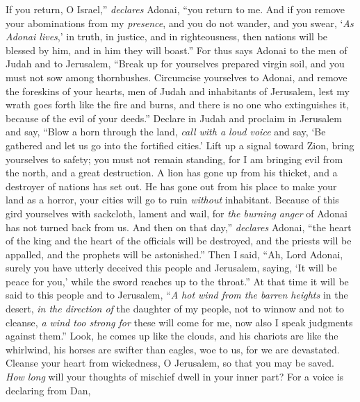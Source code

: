\begin{biblechapter} %
\verse If you return, O Israel,” \textit{declares} Adonai, 
“you return to me. 
And if you remove your abominations from my \textit{presence}, 
and you do not wander,
\verse and you swear, ‘\textit{As Adonai lives},’ 
in truth, in justice, and in righteousness, 
then nations will be blessed by him, 
and in him they will boast.”
\verse For thus says Adonai 
to the men of Judah and to Jerusalem, 
“Break up for yourselves prepared virgin soil, 
and you must not sow among thornbushes.
\verse Circumcise yourselves to Adonai, 
and remove the foreskins of your hearts, 
men of Judah and inhabitants of Jerusalem, 
lest my wrath goes forth like the fire and burns, 
and there is no one who extinguishes it, 
because of the evil of your deeds.”
 Declare in Judah and proclaim in Jerusalem and say, 
“Blow a horn through the land, 
\textit{call with a loud voice} and say, 
‘Be gathered and let us go into the fortified cities.’
\verse Lift up a signal toward Zion, 
bring yourselves to safety; you must not remain standing, 
for I am bringing evil from the north, 
and a great destruction.
\verse A lion has gone up from his thicket, 
and a destroyer of nations has set out. 
He has gone out from his place to make your land as a horror, 
your cities will go to ruin \textit{without} inhabitant.
\verse Because of this gird yourselves with sackcloth, lament and wail, 
for \textit{the burning anger} of Adonai has not turned back from us.
\verse And then on that day,” \textit{declares} Adonai, 
“the heart of the king and the heart of the officials will be destroyed, 
and the priests will be appalled, 
and the prophets will be astonished.”
\verse Then I said, “Ah, Lord Adonai, surely you have utterly deceived this people and Jerusalem, saying, ‘It will be peace for you,’ while the sword reaches up to the throat.”
\verse At that time it will be said to this people and to Jerusalem, 
“\textit{A hot wind from the barren heights} in the desert, 
\textit{in the direction of} the daughter of my people, 
not to winnow and not to cleanse,
\verse \textit{a wind too strong for} these will come for me, 
now also I speak judgments against them.”
\verse Look, he comes up like the clouds, 
and his chariots are like the whirlwind, 
his horses are swifter than eagles, 
woe to us, for we are devastated.
\verse Cleanse your heart from wickedness, O Jerusalem, 
so that you may be saved. 
\textit{How long} will your thoughts of mischief 
dwell in your inner part?
\verse For a voice is declaring from Dan, 

\end{biblechapter}
